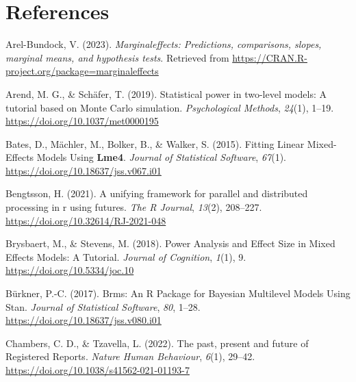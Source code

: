 \documentclass[
  man,floatsintext]{apa6}
\newlength{\cslhangindent}
\newlength{\cslentryspacingunit} %
\newenvironment{CSLReferences}[2] %
 {%
  \setlength{\parindent}{0pt}
  \ifodd #1
  \let\oldpar\par
  \def\par{\hangindent=\cslhangindent\oldpar}
  \fi
  \setlength{\parskip}{#2\cslentryspacingunit}
 }%
 {}
\begin{document}
\newpage

\hypertarget{references}{%
\section{References}\label{references}}

\hypertarget{refs}{}
\begin{CSLReferences}{1}{0}
\leavevmode{}%
Arel-Bundock, V. (2023). \emph{Marginaleffects: Predictions, comparisons, slopes, marginal means, and hypothesis tests}. Retrieved from \url{https://CRAN.R-project.org/package=marginaleffects}

\leavevmode{}%
Arend, M. G., \& Schäfer, T. (2019). Statistical power in two-level models: {A} tutorial based on {Monte Carlo} simulation. \emph{Psychological Methods}, \emph{24}(1), 1--19. \url{https://doi.org/10.1037/met0000195}

\leavevmode{}%
Bates, D., Mächler, M., Bolker, B., \& Walker, S. (2015). Fitting {Linear Mixed-Effects Models Using} {\textbf{Lme4}}. \emph{Journal of Statistical Software}, \emph{67}(1). \url{https://doi.org/10.18637/jss.v067.i01}

\leavevmode{}%
Bengtsson, H. (2021). A unifying framework for parallel and distributed processing in r using futures. \emph{The R Journal}, \emph{13}(2), 208--227. \url{https://doi.org/10.32614/RJ-2021-048}

\leavevmode{}%
Brysbaert, M., \& Stevens, M. (2018). Power {Analysis} and {Effect Size} in {Mixed Effects Models}: {A Tutorial}. \emph{Journal of Cognition}, \emph{1}(1), 9. \url{https://doi.org/10.5334/joc.10}

\leavevmode{}%
Bürkner, P.-C. (2017). Brms: {An R Package} for {Bayesian Multilevel Models Using Stan}. \emph{Journal of Statistical Software}, \emph{80}, 1--28. \url{https://doi.org/10.18637/jss.v080.i01}

\leavevmode{}%
Chambers, C. D., \& Tzavella, L. (2022). The past, present and future of {Registered Reports}. \emph{Nature Human Behaviour}, \emph{6}(1), 29--42. \url{https://doi.org/10.1038/s41562-021-01193-7}


\end{CSLReferences}
\end{document}
